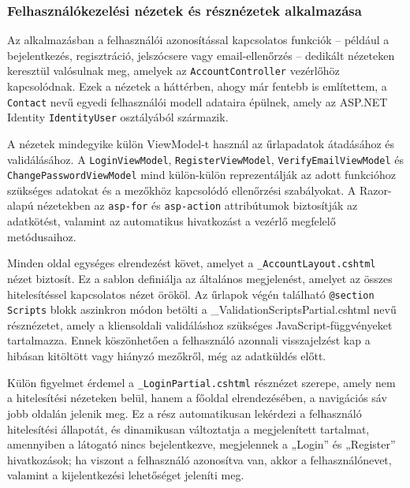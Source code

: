 \subsubsection{Felhasználókezelési nézetek és résznézetek alkalmazása}

Az alkalmazásban a felhasználói azonosítással kapcsolatos funkciók – például a bejelentkezés, regisztráció, jelszócsere vagy email-ellenőrzés – dedikált nézeteken keresztül valósulnak meg, amelyek az \texttt{AccountController} vezérlőhöz kapcsolódnak. Ezek a nézetek a háttérben, ahogy már fentebb is említettem, a \texttt{Contact} nevű egyedi felhasználói modell adataira épülnek, amely az ASP.NET Identity \texttt{IdentityUser} osztályából származik.

A nézetek mindegyike külön ViewModel-t használ az űrlapadatok átadásához és validálásához. A \texttt{LoginViewModel}, \texttt{RegisterViewModel}, \texttt{VerifyEmailViewModel} és \texttt{ChangePasswordViewModel} mind külön-külön reprezentálják az adott funkcióhoz szükséges adatokat és a mezőkhöz kapcsolódó ellenőrzési szabályokat. A Razor-alapú nézetekben az \texttt{asp-for} és \texttt{asp-action} attribútumok biztosítják az adatkötést, valamint az automatikus hivatkozást a vezérlő megfelelő metódusaihoz.

Minden oldal egységes elrendezést követ, amelyet a \texttt{\_AccountLayout.cshtml} nézet biztosít. Ez a sablon definiálja az általános megjelenést, amelyet az összes hitelesítéssel kapcsolatos nézet örököl. Az űrlapok végén található \texttt{@section Scripts} blokk aszinkron módon betölti a \_ValidationScriptsPartial.cshtml nevű résznézetet, amely a kliensoldali validáláshoz szükséges JavaScript-függvényeket tartalmazza. Ennek köszönhetően a felhasználó azonnali visszajelzést kap a hibásan kitöltött vagy hiányzó mezőkről, még az adatküldés előtt.

Külön figyelmet érdemel a \texttt{\_LoginPartial.cshtml} résznézet szerepe, amely nem a hitelesítési nézeteken belül, hanem a főoldal elrendezésében, a navigációs sáv jobb oldalán jelenik meg. Ez a rész automatikusan lekérdezi a felhasználó hitelesítési állapotát, és dinamikusan változtatja a megjelenített tartalmat, amennyiben a látogató nincs bejelentkezve, megjelennek a „Login” és „Register” hivatkozások; ha viszont a felhasználó azonosítva van, akkor a felhasználónevet, valamint a kijelentkezési lehetőséget jeleníti meg.


\vspace{\baselineskip}
